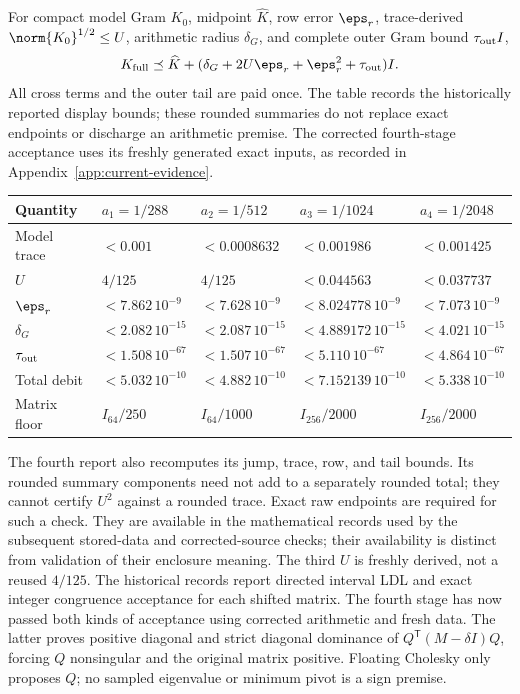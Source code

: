 \documentclass[11pt,a4paper]{article}
\numberwithin{equation}{section}
\theoremstyle{definition}\newtheorem{definition}[theorem]{Definition}
\theoremstyle{remark}\newtheorem{remark}[theorem]{Remark}
\begin{document}
For compact model Gram \(K_0\), midpoint \(\widehat K\), row error \(\eps_r\),
trace-derived \(\norm{K_0}^{1/2}\leq U\), arithmetic radius \(\delta_G\),
and complete outer Gram bound \(\tau_{\rm out}I\),
\[
K_{\rm full}\preceq\widehat K+
 (\delta_G+2U\eps_r+\eps_r^2+\tau_{\rm out})I.
\]
All cross terms and the outer tail are paid once. The table records the
historically reported display bounds; these rounded summaries do not
replace exact endpoints or discharge an arithmetic premise. The corrected
fourth-stage acceptance uses its freshly generated exact inputs, as
recorded in Appendix~\ref{app:current-evidence}.
\begin{center}\small
\begin{tabular}{@{}lllll@{}}
\toprule
Quantity & \(a_1=1/288\) & \(a_2=1/512\) & \(a_3=1/1024\) & \(a_4=1/2048\)\\
\midrule
Model trace & \(<0.001\) & \(<0.0008632\) & \(<0.001986\) & \(<0.001425\)\\
\(U\) & \(4/125\) & \(4/125\) & \(<0.044563\) & \(<0.037737\)\\
\(\eps_r\) & \(<7.862\,10^{-9}\) & \(<7.628\,10^{-9}\) & \(<8.024778\,10^{-9}\) & \(<7.073\,10^{-9}\)\\
\(\delta_G\) & \(<2.082\,10^{-15}\) & \(<2.087\,10^{-15}\) & \(<4.889172\,10^{-15}\) & \(<4.021\,10^{-15}\)\\
\(\tau_{\rm out}\) & \(<1.508\,10^{-67}\) & \(<1.507\,10^{-67}\) & \(<5.110\,10^{-67}\) & \(<4.864\,10^{-67}\)\\
Total debit & \(<5.032\,10^{-10}\) & \(<4.882\,10^{-10}\) & \(<7.152139\,10^{-10}\) & \(<5.338\,10^{-10}\)\\
Matrix floor & \(I_{64}/250\) & \(I_{64}/1000\) & \(I_{256}/2000\) & \(I_{256}/2000\)\\
\bottomrule
\end{tabular}
\end{center}
The fourth report also recomputes its jump, trace, row, and tail bounds.
Its rounded summary components need not add to a separately rounded total;
they cannot certify \(U^2\) against a rounded trace. Exact raw endpoints
are required for such a check. They are available in the mathematical
records used by the subsequent stored-data and corrected-source checks;
their availability is distinct from validation of their enclosure meaning.
The third \(U\) is freshly derived, not a reused \(4/125\).
The historical records report directed interval LDL and exact integer
congruence acceptance for each shifted matrix. The fourth stage has now
passed both kinds of acceptance using corrected arithmetic and fresh data. The latter proves positive diagonal and
strict diagonal dominance of \(Q^{\mathsf T}(M-\delta I)Q\), forcing \(Q\)
nonsingular and the original matrix positive. Floating Cholesky only
proposes \(Q\); no sampled eigenvalue or minimum pivot is a sign premise.
\end{document}
